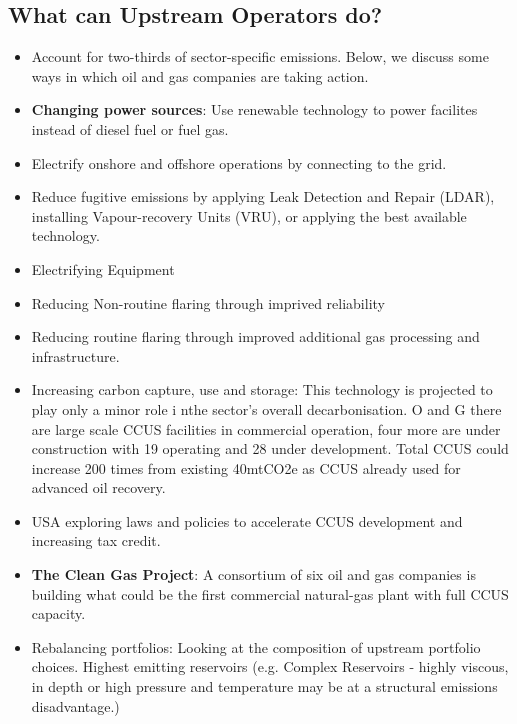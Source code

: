 \documentclass[12pt]{article}
\begin{document}
    \subsection{What can Upstream Operators do?}
    \begin{itemize}
        \item Account for two-thirds of sector-specific emissions. Below, we discuss some ways in which oil and gas companies are taking action.
        \item \textbf{Changing power sources}: Use renewable technology to power facilites instead of diesel fuel or fuel gas.
        \item Electrify onshore and offshore operations by connecting to the grid.
        \item Reduce fugitive emissions by applying Leak Detection and Repair (LDAR), installing Vapour-recovery Units (VRU), or applying the best available technology.
        \item Electrifying Equipment
        \item Reducing Non-routine flaring through imprived reliability
        \item Reducing routine flaring through improved additional gas processing and infrastructure.
        \item Increasing carbon capture, use and storage: This technology is projected to play only a minor role i nthe sector's overall decarbonisation.
              O and G there are large scale CCUS facilities in commercial operation, four more are under construction with 19 operating and 28 under development. Total CCUS could increase 200 times from existing 40mtCO2e as CCUS already used for advanced oil recovery.
        \item USA exploring laws and policies to accelerate CCUS development and increasing tax credit.
        \item \textbf{The Clean Gas Project}: A consortium of six oil and gas companies is building what could be the first commercial natural-gas plant with full CCUS capacity.
        \item Rebalancing portfolios: Looking at the composition of upstream portfolio choices. Highest emitting reservoirs (e.g. Complex Reservoirs - highly viscous, in depth or high pressure and temperature may be at a structural emissions disadvantage.)
    \end{itemize}
\end{document}
